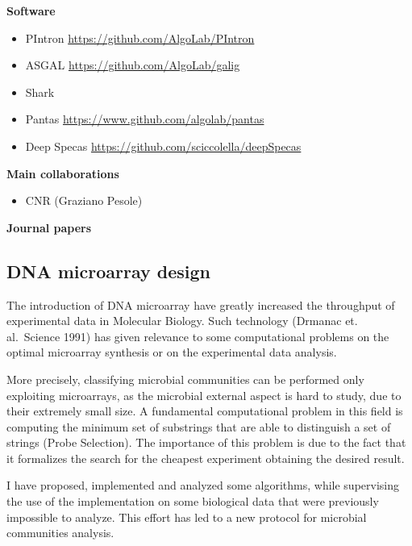 \documentclass[11pt,a4paper,roman]{moderncv}
\begin{document}
\textbf{Software}

\begin{itemize}
	\item
	      PIntron \url{https://github.com/AlgoLab/PIntron}
	\item
	      ASGAL \url{https://github.com/AlgoLab/galig}
	\item
	  Shark
\item
	  Pantas \url{https://www.github.com/algolab/pantas}
\item
	  Deep Specas \url{https://github.com/sciccolella/deepSpecas}
\end{itemize}



\textbf{Main collaborations}

\begin{itemize}
	\item
	      CNR (Graziano Pesole)
\end{itemize}

\textbf{Journal papers}

\cite{ciccolella2025}
\cite{ciccolella2024}
\cite{DBLP:journals/bioinformatics/DentiPPCVRB21}
\cite{DBLP:journals/bmcbi/DentiRBVPB18} \cite{DBLP:journals/jcb/BerettaBVPR14} \cite{DBLP:journals/bmcbi/PirolaRPPVB12}


\subsection{DNA microarray design}\label{dna-microarray-design}

The introduction of DNA microarray have greatly increased the throughput
of experimental data in Molecular Biology. Such technology (Drmanac et.
al.~Science 1991) has given relevance to some computational problems on
the optimal microarray synthesis or on the experimental data analysis.

More precisely, classifying microbial communities can be performed only
exploiting microarrays, as the microbial external aspect is hard to
study, due to their extremely small size. A fundamental computational
problem in this field is computing the minimum set of substrings that
are able to distinguish a set of strings (Probe Selection). The
importance of this problem is due to the fact that it formalizes the
search for the cheapest experiment obtaining the desired result.

I have proposed, implemented and analyzed some algorithms, while
supervising the use of the implementation on some biological data that
were previously impossible to analyze. This effort has led to a new
protocol for microbial communities analysis.
\end{document}
